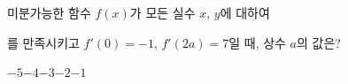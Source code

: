 미분가능한 함수 $f(x)$가 모든 실수 $x$, $y$에 대하여 \par\smallskip{}\par\smallskip\noindent 를 만족시키고 $f'(0)=-1$, $f'(2a)=7$일 때, 상수 $a$의 값은?
\begin{choices32}{$-5$}{$-4$}{$-3$}{$-2$}{$-1$}\end{choices32}
